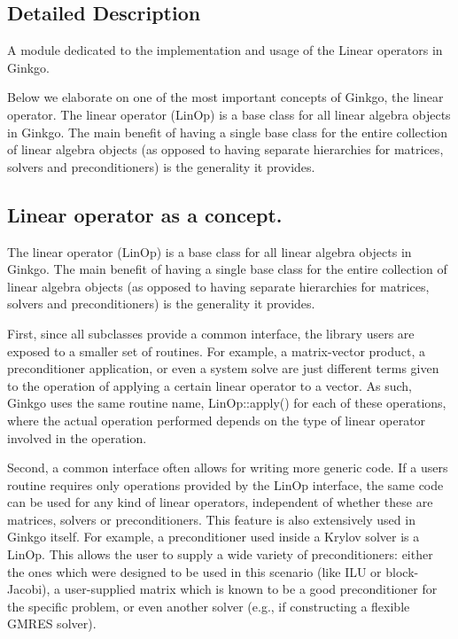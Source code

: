 \subsection{Detailed Description}
A module dedicated to the implementation and usage of the Linear operators in Ginkgo. 

Below we elaborate on one of the most important concepts of Ginkgo, the linear operator. The linear operator (Lin\+Op) is a base class for all linear algebra objects in Ginkgo. The main benefit of having a single base class for the entire collection of linear algebra objects (as opposed to having separate hierarchies for matrices, solvers and preconditioners) is the generality it provides.\hypertarget{group__LinOp_linop_1}{}\subsection{Linear operator as a concept.}\label{group__LinOp_linop_1}
The linear operator (Lin\+Op) is a base class for all linear algebra objects in Ginkgo. The main benefit of having a single base class for the entire collection of linear algebra objects (as opposed to having separate hierarchies for matrices, solvers and preconditioners) is the generality it provides.

First, since all subclasses provide a common interface, the library users are exposed to a smaller set of routines. For example, a matrix-\/vector product, a preconditioner application, or even a system solve are just different terms given to the operation of applying a certain linear operator to a vector. As such, Ginkgo uses the same routine name, Lin\+Op\+::apply() for each of these operations, where the actual operation performed depends on the type of linear operator involved in the operation.

Second, a common interface often allows for writing more generic code. If a user\textquotesingle{}s routine requires only operations provided by the Lin\+Op interface, the same code can be used for any kind of linear operators, independent of whether these are matrices, solvers or preconditioners. This feature is also extensively used in Ginkgo itself. For example, a preconditioner used inside a Krylov solver is a Lin\+Op. This allows the user to supply a wide variety of preconditioners\+: either the ones which were designed to be used in this scenario (like I\+LU or block-\/\+Jacobi), a user-\/supplied matrix which is known to be a good preconditioner for the specific problem, or even another solver (e.\+g., if constructing a flexible G\+M\+R\+ES solver).

